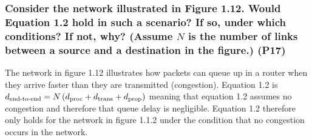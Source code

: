 \subsubsection{Consider the network illustrated in Figure 1.12. Would Equation 1.2 hold in such a scenario? If so, under which conditions? If not, why? (Assume $N$ is the number of links between a source and a destination in the figure.) (P17)}

The network in figure 1.12 illustrates how packets can queue up in a router when they arrive faster than they are transmitted (congestion). Equation 1.2 is $d_{\text{end-to-end}} = N \left (d_{\text{proc}} + d_{\text{trans}} + d_{\text{prop}}\right)$ meaning that equation 1.2 assumes no congestion and therefore that queue delay is negligible. Equation 1.2 therefore only holds for the network in figure 1.1.2 under the condition that no congestion occurs in the network.


